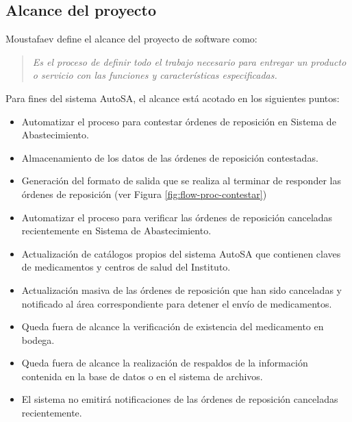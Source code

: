 \subsection{Alcance del proyecto}\label{sec-alcance}
Moustafaev define el alcance del proyecto de software como:
\begin{quote}
\textit{Es el proceso de definir todo el trabajo necesario para entregar un producto o servicio con las funciones y características especificadas\cite{ScopeManagement}.}
\end{quote}
Para fines del sistema AutoSA, el alcance está acotado en los siguientes puntos:
\begin{itemize}
\item Automatizar el proceso para contestar órdenes de reposición en Sistema de Abastecimiento.
\item Almacenamiento de los datos de las órdenes de reposición contestadas.
\item Generación del formato de salida que se realiza al terminar de responder las órdenes de reposición (ver Figura \ref{fig:flow-proc-contestar})
\item Automatizar el proceso para verificar las órdenes de reposición canceladas recientemente en Sistema de Abastecimiento.
\item Actualización de catálogos propios del sistema AutoSA que contienen claves de medicamentos y centros de salud del Instituto.
\item Actualización masiva de las órdenes de reposición que han sido canceladas y notificado al área correspondiente para detener el envío de medicamentos.
\item Queda fuera de alcance la verificación de existencia del medicamento en bodega.
\item Queda fuera de alcance la realización de respaldos de la información contenida en la base de datos o en el sistema de archivos.
\item El sistema no emitirá notificaciones de las órdenes de reposición canceladas recientemente.
\end{itemize}


